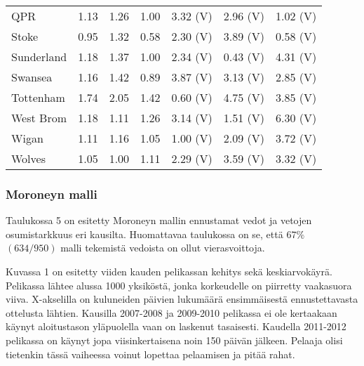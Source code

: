 \documentclass[a4paper,finnish,titlepage,12pt]{article}
\begin{document}
\begin{table}[h!]
\begin{center}
\begin{tabular}{|l||c|c|c||c|c|c|}
	QPR & 1.13 & 1.26 & 1.00 & 3.32 (V) & 2.96 (V) & 1.02 (V) \\
	Stoke & 0.95 & 1.32 & 0.58 & 2.30 (V) & 3.89 (V) & 0.58 (V) \\
	Sunderland & 1.18 & 1.37 & 1.00 & 2.34 (V) & 0.43 (V) & 4.31 (V) \\
	Swansea & 1.16 & 1.42 & 0.89 & 3.87 (V) & 3.13 (V) & 2.85 (V) \\
	Tottenham & 1.74 & 2.05 & 1.42 & 0.60 (V) & 4.75 (V) & 3.85 (V) \\
	West Brom & 1.18 & 1.11 & 1.26 & 3.14 (V) & 1.51 (V) & 6.30 (V) \\
	Wigan & 1.11 & 1.16 & 1.05 & 1.00 (V) & 2.09 (V) & 3.72 (V) \\
	Wolves & 1.05 & 1.00 & 1.11 & 2.29 (V) & 3.59 (V) & 3.32 (V) \\
        \hline
    \end{tabular}
\end{center}
\end{table}


\newpage


\subsubsection{Moroneyn malli}

Taulukossa 5 on esitetty Moroneyn mallin ennustamat vedot ja vetojen osumistarkkuus eri kausilta.
Huomattavaa taulukossa on se, että $67 \%$ $(634/950)$ malli tekemistä vedoista on ollut vierasvoittoja.

Kuvassa 1 on esitetty viiden kauden pelikassan kehitys sekä keskiarvokäyrä.
Pelikassa lähtee alussa 1000 yksiköstä, jonka korkeudelle on piirretty vaakasuora viiva. X-akselilla on kuluneiden päivien lukumäärä ensimmäisestä ennustettavasta ottelusta lähtien.
Kausilla 2007-2008 ja 2009-2010 pelikassa ei ole kertaakaan käynyt aloitustason yläpuolella vaan on laskenut tasaisesti.
Kaudella 2011-2012 pelikassa on käynyt jopa viisinkertaisena noin 150 päivän jälkeen. Pelaaja olisi tietenkin tässä vaiheessa voinut lopettaa pelaamisen ja pitää rahat.
\end{document}
